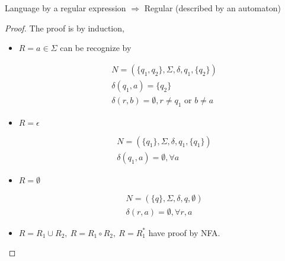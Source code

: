 \begin{lemma}
    Language by a regular expression $\Longrightarrow$ Regular (described by an automaton)
\end{lemma}
\begin{proof}
    The proof is by induction,
    \begin{itemize}
        \item $R = a \in \Sigma$ can be recognize by
        \begin{center}
        \end{center}
        \begin{align*}
            & N = (\{q_1,q_2\}, \Sigma, \delta, q_1, \{q_2\}) \\
            & \delta(q_1,a)= \{q_2\} \\
            & \delta(r,b)=\emptyset, r \neq q_1\mbox{ or } b \neq a
        \end{align*}

        \item $R = \epsilon$
        \begin{center}
        \end{center}
        \begin{align*}
            & N=(\{q_1\},\Sigma,\delta, q_1, \{q_1\}) \\
            & \delta(q_1,a)=\emptyset, \forall a
        \end{align*}

        \item $R = \emptyset$
        \begin{center}
        \end{center}
        \begin{align*}
            &N=(\{q\}, \Sigma, \delta, q, \emptyset)\\
            &\delta(r,a)=\emptyset, \forall r, a
        \end{align*}

        \item $R=R_1\cup R_2, \ R=R_1 \circ R_2, \ R=R_1^*$ have proof by NFA.
    \end{itemize}
\end{proof}

